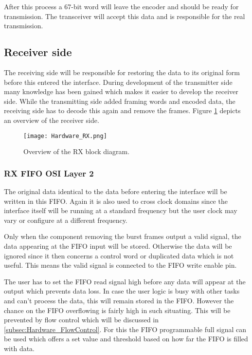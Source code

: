 		After this process a 67-bit word will leave the encoder and should be ready for transmission. The transceiver will accept this data and is responsible for the real transmission.

\newpage
\subsection{Receiver side}
	The receiving side will be responsible for restoring the data to its original form before this entered the interface. During development of the transmitter side many knowledge has been gained which makes it easier to develop the receiver side. While the transmitting side added framing words and encoded data, the receiving side has to decode this again and remove the frames. Figure \ref{Fig:Hardware_RX} depicts an overview of the receiver side.
	
	\begin{figure}[H]
		\centering
		\texttt{[image: Hardware\_RX.png]}	
		\caption{Overview of the RX block diagram.}
		\label{Fig:Hardware_RX}
	\end{figure}
	
	\subsubsection[RX FIFO]{RX FIFO \hfill OSI Layer 2}
		The original data identical to the data before entering the interface will be written in this FIFO. Again it is also used to cross clock domains since the interface itself will be running at a standard frequency but the user clock may vary or configure at a different frequency. 
		
		Only when the component removing the burst frames output a valid signal, the data appearing at the FIFO input will be stored. Otherwise the data will be ignored since it then concerns a control word or duplicated data which is not useful. This means the valid signal is connected to the FIFO write enable pin.
		
		The user has to set the FIFO read signal high before any data will appear at the output which prevents data loss. In case the user logic is busy with other tasks and can't process the data, this will remain stored in the FIFO. However the chance on the FIFO overflowing is fairly high in such situating. This will be prevented by flow control which will be discussed in \ref{subsec:Hardware_FlowControl}. For this the FIFO programmable full signal can be used which offers a set value and threshold based on how far the FIFO is filled with data.\\ 
		
